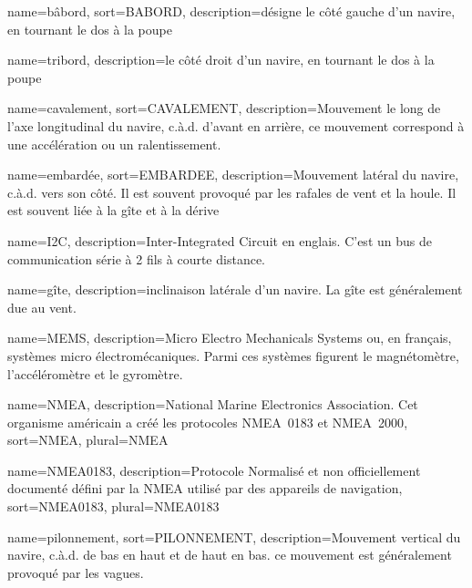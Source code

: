 

 {
	name=bâbord,
	sort={BABORD},
	description={désigne le côté gauche d'un navire, en tournant le dos à la poupe}
}

 {
	name=tribord,
	description={le côté droit d'un navire, en tournant le dos à la poupe}
}

 {
	name=cavalement,
	sort={CAVALEMENT},
	description={Mouvement le long de l'axe longitudinal du navire, c.à.d. d'avant en arrière, ce mouvement correspond à une accélération ou un ralentissement.}
}

 {
	name=embardée,
	sort={EMBARDEE},
	description={Mouvement latéral du navire, c.à.d. vers son côté. Il est souvent provoqué par les rafales de vent et la houle. Il est souvent liée à la gîte et à la dérive}
}

 {
	name=I2C,
	description={Inter-Integrated Circuit en englais. C'est un bus de communication série à 2 fils à courte distance.}
}

 {
	name=gîte,
	description={inclinaison latérale d'un navire. La gîte est généralement due au vent.}
}

 {
    name=MEMS,
    description={Micro Electro Mechanicals Systems ou, en français, systèmes micro électromécaniques. Parmi ces systèmes figurent le magnétomètre, l'accéléromètre et le gyromètre.}
    }

{
	name={NMEA}, %
	description={National Marine Electronics Association. Cet organisme américain a créé les protocoles NMEA~0183 et NMEA~2000}, %
	sort={NMEA}, %
	plural={NMEA} %
}

{
	name={NMEA0183}, %
	description={Protocole Normalisé et non officiellement documenté défini par la NMEA utilisé par des appareils de navigation}, %
	sort={NMEA0183}, %
	plural={NMEA0183} %
}

 {
    name=pilonnement,
    sort={PILONNEMENT},
    description={Mouvement vertical du navire, c.à.d. de bas en haut et de haut en bas. ce mouvement est généralement provoqué par les vagues.}
    }

